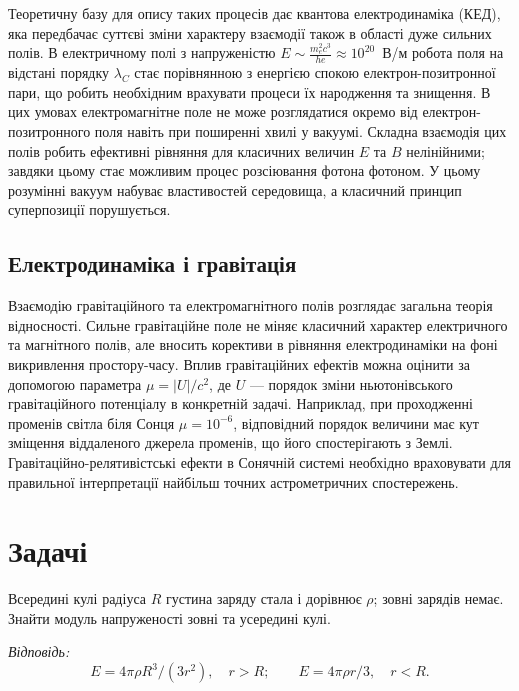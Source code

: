 Теоретичну базу для опису таких процесів дає квантова електродинаміка (КЕД), яка передбачає суттєві зміни характеру
взаємодії також в області дуже сильних полів. В електричному полі з напруженістю $E \sim \frac{m_e^2 c^3}{he} \approx
10^{20}$~В/м робота поля на відстані порядку $\lambda_C$ стає порівнянною з енергією спокою електрон-позитронної пари,
що робить необхідним врахувати процеси їх народження та знищення. В цих умовах електромагнітне поле не може розглядатися
окремо від електрон-позитронного поля навіть при поширенні хвилі у вакуумі. Складна взаємодія цих полів робить ефективні
рівняння для класичних величин $E$ та $B$ нелінійними; завдяки цьому стає можливим процес розсіювання фотона фотоном. У
цьому розумінні вакуум набуває властивостей середовища, а класичний принцип суперпозиції порушується.


\subsection*{Електродинаміка і гравітація}

Взаємодію гравітаційного та електромагнітного полів розглядає загальна теорія відносності. Сильне гравітаційне поле не
міняє класичний характер електричного та магнітного полів, але вносить корективи в рівняння електродинаміки на фоні
викривлення простору-часу. Вплив гравітаційних ефектів можна оцінити за допомогою параметра $\mu = |U|/c^2$, де $U$ ---
порядок зміни ньютонівського гравітаційного потенціалу в конкретній задачі. Наприклад, при проходженні променів світла
біля Сонця $\mu = 10^{-6}$, відповідний порядок величини має кут зміщення віддаленого джерела променів, що його
спостерігають з Землі. Гравітаційно-релятивістські ефекти в Сонячній системі необхідно враховувати для правильної
інтерпретації найбільш точних астрометричних спостережень.


\section*{Задачі}

\begin{problem}
	Всередині кулі радіуса \(R\) густина заряду стала і дорівнює \(\rho\); зовні зарядів немає. Знайти модуль
	напруженості зовні та усередині кулі.

	\textit{Відповідь:}
	\[
		E = 4\pi\rho R^3/(3r^2), \quad r > R; \qquad
		E = 4\pi\rho r/3, \quad r < R.
	\]
\end{problem}


